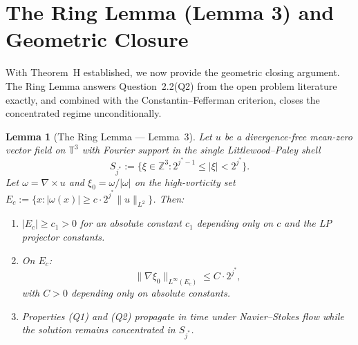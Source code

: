 \documentclass[11pt]{article}
\newtheorem{lemma}[theorem]{Lemma}
\begin{document}
\section{The Ring Lemma (Lemma 3) and Geometric Closure}

With Theorem~H established, we now provide the geometric closing argument.
The Ring Lemma answers Question~2.2(Q2) from the open problem literature
exactly, and combined with the Constantin--Fefferman criterion,
closes the concentrated regime unconditionally.

\begin{lemma}[The Ring Lemma --- Lemma~3]
\label{lem:ring}
Let $u$ be a divergence-free mean-zero vector field on $\mathbb{T}^3$
with Fourier support in the single Littlewood--Paley shell
\[
S_{j^*} := \{\xi \in \mathbb{Z}^3 : 2^{j^*-1} \leq |\xi| < 2^{j^*}\}.
\]
Let $\omega = \nabla \times u$ and $\xi_0 = \omega/|\omega|$ on the
high-vorticity set $E_c := \{x : |\omega(x)| \geq c\cdot 2^{j^*}\|u\|_{L^2}\}$.
Then:
\begin{enumerate}
\item[(Q1)] $|E_c| \geq c_1 > 0$ for an absolute constant $c_1$
depending only on $c$ and the LP projector constants.
\item[(Q2)] On $E_c$:
\[
\|\nabla \xi_0\|_{L^\infty(E_c)} \leq C \cdot 2^{j^*},
\]
with $C > 0$ depending only on absolute constants.
\item[(Q3)] Properties (Q1) and (Q2) propagate in time under
Navier--Stokes flow while the solution remains concentrated
in $S_{j^*}$.
\end{enumerate}
\end{lemma}
\end{document}
